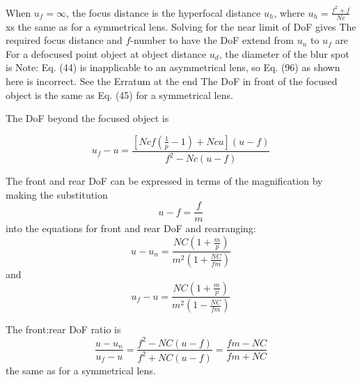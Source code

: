 \documentclass[11pt, oneside]{scrartcl}   	%
\begin{document}
When $u_f = \infty$, the focus distance is the hyperfocal distance $u_h$, where $u_h =\frac{ f^2 + f}{Nc}$xs
the same as for a symmetrical lens. Solving for the near limit of DoF gives
The required focus distance and $f$-number to have the DoF extend from $u_n$ to $u_f$ are
For a defocused point object at object distance $u_d$, the diameter of the blur spot is
Note: Eq. (44) is inapplicable to an asymmetrical lens, so Eq. (96) as shown here is incorrect. See the Erratum at the end
The DoF in front of the focused object is
the same as Eq. (45) for a symmetrical lens.

The DoF beyond the focused object is

\begin{equation}
u_f-u=\frac{\left[Ncf\left(\frac 1 p -1\right) + Ncu\right](u-f)}{f^2-Nc(u-f)}
   \label{eq:dofbfo}
\end{equation}

The front and rear DoF can be expressed in terms of the magnification by making the substitution
\begin{equation}
u-f = \frac f m
\end{equation}
 into the equations for front and rear DoF and rearranging:
\begin{equation}
u-u_n = \frac{NC\left(1+ \frac m p\right)}{m^2\left(1+\frac{NC}{fm}\right)}
\end{equation}
and
\begin{equation}
u_f-u = \frac{NC\left(1+ \frac m p\right)}{m^2\left(1-\frac{NC}{fm}\right)}
\end{equation}

The front:rear DoF ratio is 
\begin{equation}
   \frac{u - u_n}{u_f-u} =  \frac{f^2 - NC(u-f)}{f^2 + NC(u-f)} = \frac{fm - NC}{fm + NC}
   \label{eq:frdofratio}
\end{equation}
the same as for a symmetrical lens.
\end{document}
